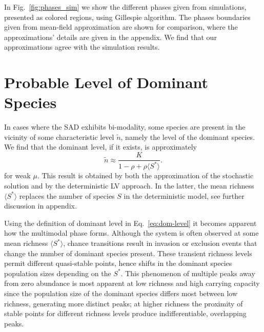 \documentclass[9pt,lineno]{elife}
\begin{document}
In Fig.~\ref{fig:phases_sim} we show the different phases given from simulations, presented as colored regions, using Gillespie algorithm. 
The phases boundaries given from mean-field approximation are shown for comparison, where the approximations' details are given in the appendix. 
We find that our approximations agree with the simulation results.


\section{Probable Level of Dominant Species}

\label{sec:Dom_species}

In cases where the SAD exhibits bi-modality, some species are present in the vicinity of some characteristic level $\tilde{n}$, namely the level of the dominant species. We find that the dominant level, if it exists, is approximately
\begin{equation}
    \tilde{n}\approx \frac{K}{1-\rho+\rho \langle S^*\rangle }.
    \label{eq:dom-level}
\end{equation}
for weak $\mu$. 
This result is obtained  by both the approximation of the stochastic solution and by the deterministic LV approach. 
In the latter, the mean richness $\langle S^*\rangle $ replaces the number of species $S$ in the deterministic model, see further discussion in appendix.

Using the definition of dominant level in Eq.~\eqref{eq:dom-level} it becomes apparent how the multimodal phase forms. Although the system is often observed at some mean richness $\langle S^* \rangle$, chance transitions result in invasion or exclusion events that change the number of dominant species present.
These transient richness levels permit different quasi-stable points, hence shifts in the dominant species population sizes depending on the $S^*$.
This phenomenon of multiple peaks away from zero abundance is most apparent at low richness and high carrying capacity since the population size of the dominant species differs most between low richness, generating more distinct peaks; at higher richness the proximity of stable points for different richness levels produce indifferentiable, overlapping peaks.

\end{document}
